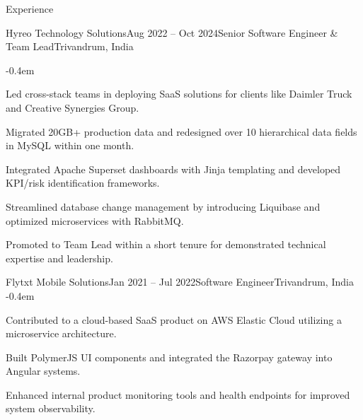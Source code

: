 \documentclass{resume} %
\begin{document}
\begin{rSection}{Experience}
\begin{rSubsection}{Hyreo Technology Solutions}{Aug 2022 -- Oct 2024}{Senior Software Engineer \& Team Lead}{Trivandrum, India}

    \itemsep -0.4em
    \vspace{-0.5em}


    \item Led cross-stack teams in deploying SaaS solutions for clients like Daimler Truck and Creative Synergies Group.
    \item Migrated 20GB+ production data and redesigned over 10 hierarchical data fields in MySQL within one month.
    \item Integrated Apache Superset dashboards with Jinja templating and developed KPI/risk identification frameworks.
    \item Streamlined database change management by introducing Liquibase and optimized microservices with RabbitMQ.
    \item Promoted to Team Lead within a short tenure for demonstrated technical expertise and leadership.
\end{rSubsection}
\vspace{-0.4em}

\begin{rSubsection}{Flytxt Mobile Solutions}{Jan 2021 -- Jul 2022}{Software Engineer}{Trivandrum, India}
    \itemsep -0.4em
    \vspace{-0.5em}


    \item Contributed to a cloud-based SaaS product on AWS Elastic Cloud utilizing a microservice architecture.
    \item Built PolymerJS UI components and integrated the Razorpay gateway into Angular systems.
    \item Enhanced internal product monitoring tools and health endpoints for improved system observability.
\end{rSubsection}

\end{rSection}
\vspace{-1.0em} %
\end{document}
